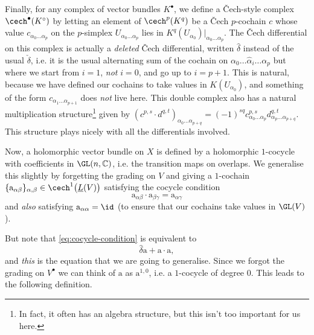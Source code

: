         Finally, for any complex of vector bundles $K^\bullet$, we define a Čech-style complex $\cech^\bullet(K^\circ)$ by letting an element of $\cech^p(K^q)$ be a Čech $p$-cochain $c$ whose value $c_{\alpha_0\ldots\alpha_p}$ on the $p$-simplex $U_{\alpha_0\ldots\alpha_p}$ lies in $K^q(U_{\alpha_0})|_{\alpha_0\ldots\alpha_p}$.
        The Čech differential on this complex is actually a \textit{deleted} Čech differential, written $\hat{\delta}$ instead of the usual $\check{\delta}$, i.e. it is the usual alternating sum of the cochain on $\alpha_0\ldots\hat{\alpha}_i\ldots\alpha_p$ but where we start from $i=1$, \emph{not} $i=0$, and go up to $i=p+1$.
        This is natural, because we have defined our cochains to take values in $K(U_{\alpha_0})$, and something of the form $c_{\alpha_1\ldots\alpha_{p+1}}$ does \textit{not} live here.
        This double complex also has a natural multiplication structure\footnote{In fact, it often has an algebra structure, but this isn't too important for us here.} given by $(c^{p,s}\cdot d^{q,t})_{\alpha_0\ldots\alpha_{p+q}} = (-1)^{sq}c^{p,s}_{\alpha_0\ldots\alpha_p}d^{q,t}_{\alpha_p\ldots\alpha_{p+q}}$.
        This structure plays nicely with all the differentials involved.

        \bigskip

        Now, a holomorphic vector bundle on $X$ is defined by a holomorphic $1$-cocycle with coefficients in $\GL(n,\mathbb{C})$, i.e. the transition maps on overlaps.
        We generalise this slightly by forgetting the grading on $V$ and giving a $1$-cochain $\{\mathrm{a}_{\alpha\beta}\}_{\alpha,\beta} \in \cech^1\big(\underline{L}(V)\big)$ satisfying the cocycle condition
        \begin{equation}\label{eq:cocycle-condition}
            \mathrm{a}_{\alpha\beta}\cdot\mathrm{a}_{\beta\gamma}=\mathrm{a}_{\alpha\gamma}
        \end{equation}
        and \textit{also} satisfying $\mathrm{a}_{\alpha\alpha}=\id$ (to ensure that our cochains take values in $\GL(V)$).

        But note that \cref{eq:cocycle-condition} is equivalent to
        \begin{equation}
            \hat{\delta}\mathrm{a}+\mathrm{a}\cdot\mathrm{a},
        \end{equation}
        and \textit{this} is the equation that we are going to generalise.
        Since we forgot the grading on $V^\bullet$ we can think of $\mathrm{a}$ as $\mathrm{a}^{1,0}$, i.e. a $1$-cocycle of degree $0$.
        This leads to the following definition.


